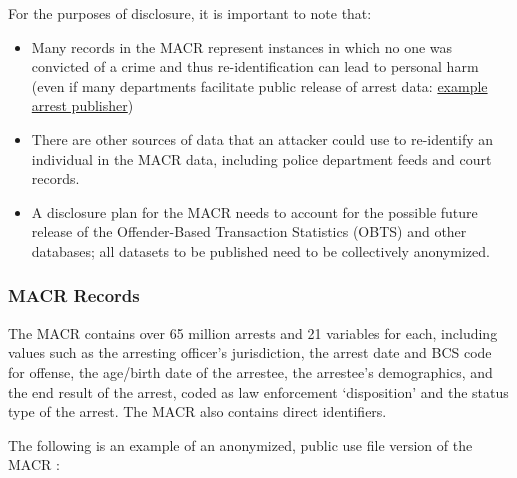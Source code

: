 \documentclass[]{article}
\providecommand{\tightlist}{%
  \setlength{\itemsep}{0pt}\setlength{\parskip}{0pt}}
\begin{document}
For the purposes of disclosure, it is important to note that:

\begin{itemize}
\tightlist
\item
  Many records in the MACR represent instances in which no one was
  convicted of a crime and thus re-identification can lead to personal
  harm (even if many departments facilitate public release of arrest
  data: \href{https://www.localcrimenews.com/welcome/citylist}{example
  arrest publisher})
\item
  There are other sources of data that an attacker could use to
  re-identify an individual in the MACR data, including police
  department feeds and court records.
\item
  A disclosure plan for the MACR needs to account for the possible
  future release of the Offender-Based Transaction Statistics (OBTS) and
  other databases; all datasets to be published need to be collectively
  anonymized.
\end{itemize}

\subsubsection{MACR Records}\label{macr-records}

The MACR contains over 65 million arrests and 21 variables for each,
including values such as the arresting officer's jurisdiction, the
arrest date and BCS code for offense, the age/birth date of the
arrestee, the arrestee's demographics, and the end result of the arrest,
coded as law enforcement `disposition' and the status type of the
arrest. The MACR also contains direct identifiers.

The following is an example of an anonymized, public use file version of
the MACR :
\end{document}
